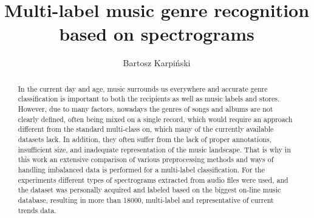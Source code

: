 \documentclass[runningheads]{llncs}
\begin{document}
%
\title{Multi-label music genre recognition based on spectrograms}
%
%
\author{Bartosz Karpiński }
%
%
%
\maketitle              %
%

\begin{abstract}
In the current day and age, music surrounds us everywhere and accurate genre classification is important to both the recipients as well as music labels and stores. However, due to many factors, nowadays the genres of songs and albums are not clearly defined, often being mixed on a single record, which would require an approach different from the standard multi-class on, which many of the currently available datasets lack. In addition, they often suffer from the lack of proper annotations, insufficient size, and inadequate representation of the music landscape. That is why in this work an extensive comparison of various preprocessing methods and ways of handling imbalanced data is performed for a multi-label classification. For the experiments different types of spectrograms extracted from audio files were used, and the dataset was personally acquired and labeled based on the biggest on-line music database, resulting in more than 18000, multi-label and representative of current trends data.


\end{abstract}
\end{document}
